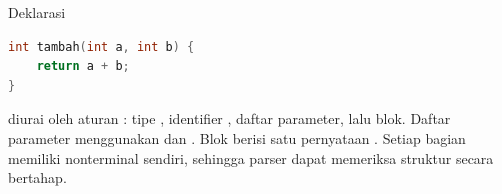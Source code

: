 \begin{contoh}
Deklarasi
\begin{lstlisting}[language=C]
int tambah(int a, int b) {
    return a + b;
}
\end{lstlisting}
diurai oleh aturan : tipe , identifier
, daftar parameter, lalu blok. Daftar parameter
menggunakan  dan . Blok berisi satu
pernyataan . Setiap bagian memiliki nonterminal sendiri,
sehingga parser dapat memeriksa struktur secara bertahap.
\end{contoh}
